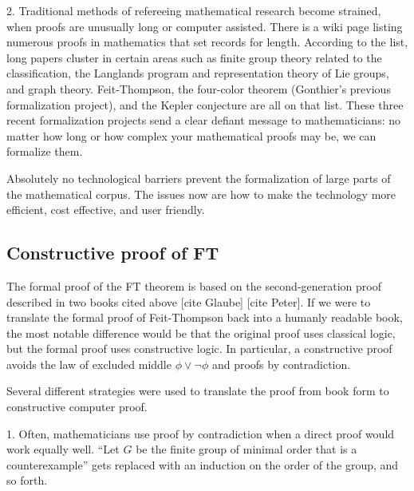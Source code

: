 \documentclass[brochure,english,12pt]{bourbaki}
\theoremstyle{plain}
\begin{document}


2. Traditional methods of refereeing mathematical research become strained, when
proofs are unusually long or computer assisted.  There is a wiki page listing numerous proofs
in mathematics that set records for length.
According to the list,
long papers cluster in certain areas
such as finite group theory related to the classification, 
the Langlands program and representation theory of Lie groups,
and graph theory.  Feit-Thompson, the four-color theorem (Gonthier's previous formalization
project), and the Kepler conjecture are all on that list. 
These three recent formalization projects send a clear defiant message  to mathematicians:
no matter how long or how complex your mathematical proofs may be, we can formalize them.

Absolutely no technological barriers 
prevent the formalization of large parts of the mathematical corpus.  The issues now
are how to make the technology more efficient, cost effective, and user friendly.



\subsection{Constructive proof of FT}

The formal proof of the FT theorem is based on the second-generation proof described in
two books cited above [cite Glaube] [cite Peter].
If we were to translate the formal proof of Feit-Thompson back into a humanly readable book, 
the most notable difference would be that the original proof uses classical logic,
but the formal proof uses constructive logic.  In particular, a constructive proof avoids
 the law of excluded middle $\phi\lor \neg \phi$ and proofs by contradiction.

Several different strategies were used to translate the proof from book form to
constructive computer proof.

1.  Often, mathematicians use proof by contradiction when a direct proof
would work equally well.  
``Let $G$ be the finite group of minimal order that is a counterexample'' gets
replaced with an induction on the order of the group, and so forth.
\end{document}
